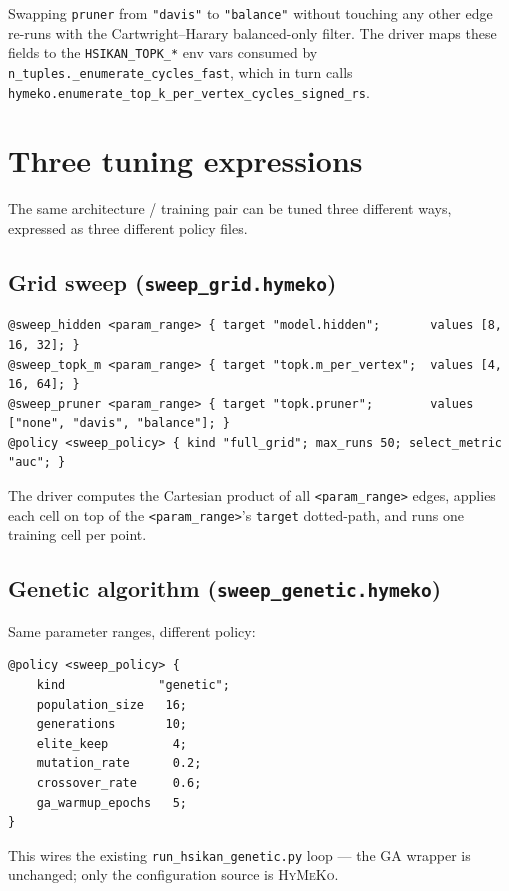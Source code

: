 \documentclass[11pt,a4paper]{article}
\newcommand{\HyMeKo}{\textsc{HyMeKo}}
\newcommand{\code}[1]{\texttt{\small #1}}
\begin{document}
Swapping \code{pruner} from \code{"davis"} to \code{"balance"}
without touching any other edge re-runs with the
Cartwright--Harary balanced-only filter. The driver maps these
fields to the \code{HSIKAN\_TOPK\_*} env vars consumed by
\code{n\_tuples.\_enumerate\_cycles\_fast}, which in turn calls
\code{hymeko.enumerate\_top\_k\_per\_vertex\_cycles\_signed\_rs}.

\section{Three tuning expressions}

The same architecture / training pair can be tuned three different
ways, expressed as three different policy files.

\subsection{Grid sweep (\code{sweep\_grid.hymeko})}

\begin{lstlisting}
@sweep_hidden <param_range> { target "model.hidden";       values [8, 16, 32]; }
@sweep_topk_m <param_range> { target "topk.m_per_vertex";  values [4, 16, 64]; }
@sweep_pruner <param_range> { target "topk.pruner";        values ["none", "davis", "balance"]; }
@policy <sweep_policy> { kind "full_grid"; max_runs 50; select_metric "auc"; }
\end{lstlisting}

The driver computes the Cartesian product of all
\code{<param\_range>} edges, applies each cell on top of the
\code{<param\_range>}'s \code{target} dotted-path, and runs one
training cell per point.

\subsection{Genetic algorithm (\code{sweep\_genetic.hymeko})}

Same parameter ranges, different policy:

\begin{lstlisting}
@policy <sweep_policy> {
    kind             "genetic";
    population_size   16;
    generations       10;
    elite_keep         4;
    mutation_rate      0.2;
    crossover_rate     0.6;
    ga_warmup_epochs   5;
}
\end{lstlisting}

This wires the existing \code{run\_hsikan\_genetic.py} loop ---
the GA wrapper is unchanged; only the configuration source is
\HyMeKo.
\end{document}
